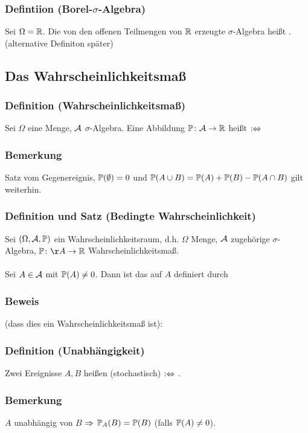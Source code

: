 \subsubsection{Defintiion (Borel-$\sigma$-Algebra)}
Sei $\Omega=\mathbb{R}$. Die von den offenen Teilmengen von $\mathbb{R}$ erzeugte $\sigma$-Algebra hei\ss{}t . (alternative Definiton sp\"ater)
\subsection{Das Wahrscheinlichkeitsma\ss{}}
\subsubsection{Definition (Wahrscheinlichkeitsma\ss{})}
Sei $\Omega$ eine Menge, $\mathcal{A}$ $\sigma$-Algebra. Eine Abbildung $\mathbb{P}\colon\mathcal{A}\to\mathbb{R}$ hei\ss{}t  $:\Leftrightarrow$
\subsubsection{Bemerkung}
Satz vom Gegenereignis, $\mathbb{P}(\emptyset)=0$ und $\mathbb{P}(A\cup B)=\mathbb{P}(A)+\mathbb{P}(B)-\mathbb{P}(A\cap B)$ gilt weiterhin.
\subsubsection{Definition und Satz (Bedingte Wahrscheinlichkeit)}
Sei $(\Omega,\mathcal{A},\mathbb{P})$ ein Wahrscheinlichkeitsraum, d.h. $\Omega$ Menge, $\mathcal{A}$ zugeh\"orige $\sigma$-Algebra, $\PP\colon\AA\to\RR$ Wahrscheinlichkeitsma\ss{}.
\\~\\
Sei $A\in\mathcal{A}$ mit $\mathbb{P}(A)\neq0$. Dann ist das auf $A$  definiert durch
\subsubsection{Beweis}
(dass dies ein Wahrscheinlichkeitsma\ss{} ist):
\subsubsection{Definition (Unabh\"angigkeit)}
Zwei Ereignisse $A,B$ hei\ss{}en (stochastisch)  $:\Leftrightarrow$
.
\subsubsection{Bemerkung}
$A$ unabh\"angig von $B$ $\Rightarrow$ $\mathbb{P}_A(B)=\mathbb{P}(B)$ (falls $\mathbb{P}(A)\neq0$).
